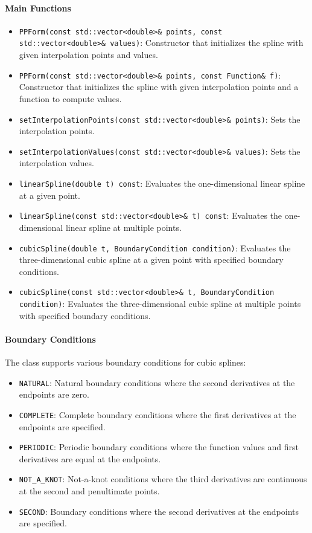 \documentclass[a4paper]{article}
\begin{document}
\begin{sloppypar}
\paragraph*{Main Functions}
\begin{itemize}
  \item \verb|PPForm(const std::vector<double>& points, const std::vector<double>& values)|: Constructor that initializes the spline with given interpolation points and values.
  \item \verb|PPForm(const std::vector<double>& points, const Function& f)|: Constructor that initializes the spline with given interpolation points and a function to compute values.
  \item \verb|setInterpolationPoints(const std::vector<double>& points)|: Sets the interpolation points.
  \item \verb|setInterpolationValues(const std::vector<double>& values)|: Sets the interpolation values.
  \item \verb|linearSpline(double t) const|: Evaluates the one-dimensional linear spline at a given point.
  \item \verb|linearSpline(const std::vector<double>& t) const|: Evaluates the one-dimensional linear spline at multiple points.
  \item \verb|cubicSpline(double t, BoundaryCondition condition)|: Evaluates the three-dimensional cubic spline at a given point with specified boundary conditions.
  \item \verb|cubicSpline(const std::vector<double>& t, BoundaryCondition condition)|: Evaluates the three-dimensional cubic spline at multiple points with specified boundary conditions.
\end{itemize}

\paragraph*{Boundary Conditions}
The class supports various boundary conditions for cubic splines:
\begin{itemize}
  \item \verb|NATURAL|: Natural boundary conditions where the second derivatives at the endpoints are zero.
  \item \verb|COMPLETE|: Complete boundary conditions where the first derivatives at the endpoints are specified.
  \item \verb|PERIODIC|: Periodic boundary conditions where the function values and first derivatives are equal at the endpoints.
  \item \verb|NOT_A_KNOT|: Not-a-knot conditions where the third derivatives are continuous at the second and penultimate points.
  \item \verb|SECOND|: Boundary conditions where the second derivatives at the endpoints are specified.
\end{itemize}


\end{sloppypar}
\end{document}
